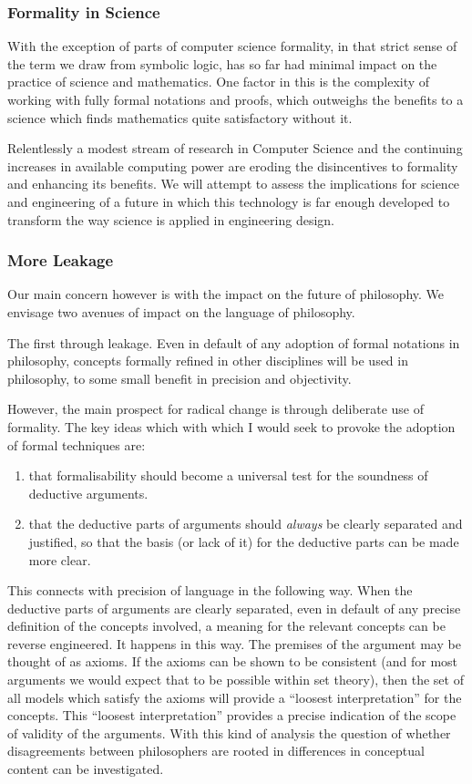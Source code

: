 \subsubsection{Formality in Science}

With the exception of parts of computer science formality, in that strict sense of the term we draw from symbolic logic, has so far had minimal impact on the practice of science and mathematics.
One factor in this is the complexity of working with fully formal notations and proofs, which outweighs the benefits to a science which finds mathematics quite satisfactory without it.

Relentlessly a modest stream of research in Computer Science and the continuing increases in available computing power are eroding the disincentives to formality and enhancing its benefits.
We will attempt to assess the implications for science and engineering of a future in which this technology is far enough developed to transform the way science is applied in engineering design.

\subsubsection{More Leakage}

Our main concern however is with the impact on the future of philosophy.
We envisage two avenues of impact on the language of philosophy.

The first through leakage.
Even in default of any adoption of formal notations in philosophy, concepts formally refined in other disciplines will be used in philosophy, to some small benefit in precision and objectivity.

However, the main prospect for radical change is through deliberate use of formality.
The key ideas which with which I would seek to provoke the adoption of formal techniques are:
\begin{enumerate}
\item that formalisability should become a universal test for the soundness of deductive arguments.
\item that the deductive parts of arguments should {\it always} be clearly separated and justified, so that the basis (or lack of it) for the deductive parts can be made more clear.
\end{enumerate}

This connects with precision of language in the following way.
When the deductive parts of arguments are clearly separated, even in default of any precise definition of the concepts involved, a meaning for the relevant concepts can be reverse engineered.
It happens in this way.
The premises of the argument may be thought of as axioms.
If the axioms can be shown to be consistent (and for most arguments we would expect that to be possible within set theory), then the set of all models which satisfy the axioms will provide a ``loosest interpretation'' for the concepts.
This ``loosest interpretation'' provides a precise indication of the scope of validity of the arguments.
With this kind of analysis the question of whether disagreements between philosophers are rooted in differences in conceptual content can be investigated.
